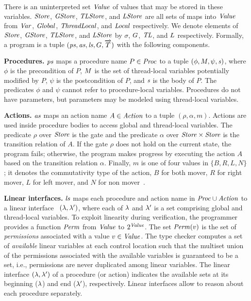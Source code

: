There is an uninterpreted set $\mathit{Value}$ of values that may be stored in these variables.
$\mathit{Store}$, $\mathit{GStore}$, $\mathit{TLStore}$, and $\mathit{LStore}$ are all sets of maps into $\mathit{Value}$
from $\mathit{Var}$, $\mathit{Global}$, $\mathit{ThreadLocal}$, and $\mathit{Local}$ respectively.
We denote elements of $\mathit{Store}$, $\mathit{GStore}$, $\mathit{TLStore}$, and $\mathit{LStore}$
by $\sigma$, $G$, $\mathit{TL}$, and $L$ respectively.
Formally, a \civl program is a tuple $(\mathit{ps}, \mathit{as}, \mathit{ls}, G, \overrightarrow{T})$ with the following components.

\noindent
{\bf Procedures.}
$\mathit{ps}$ maps a procedure name $P \in \mathit{Proc}$ to a tuple $(\phi, M, \psi, \mathit{s})$, 
where $\phi$ is the precondition of $P$, $M$ is the set of thread-local variables potentially modified by $P$, 
$\psi$ is the postcondition of $P$, and $\mathit{s}$ is the body of $P$.
The predicates $\phi$ and $\psi$ cannot refer to procedure-local variables.
Procedures do not have parameters, but parameters may be modeled using thread-local variables.

\noindent
{\bf Actions.}
$\mathit{as}$ maps an action name $A \in \mathit{Action}$ to a tuple $(\rho,\alpha,m)$.
Actions are used inside procedure bodies to access global and thread-local variables.
The predicate $\rho$ over $\mathit{Store}$ is the gate and the predicate $\alpha$ over $\mathit{Store} \times \mathit{Store}$ 
is the transition relation of $A$.
If the gate $\rho$ does not hold on the current state, the program fails;
otherwise, the program makes progress by executing the action $A$ based on the transition relation $\alpha$.
Finally, $m$ is one of four values in $\{B,R,L,N\}$;
it denotes the commutativity type of the action, $B$ for both mover, $R$ for right mover, $L$ for left mover, 
and $N$ for non mover~\cite{FlanaganFLQ08}. 

\noindent
{\bf Linear interfaces.}
$\mathit{ls}$ maps each procedure and action name in $\mathit{Proc} \cup \mathit{Action}$ to a linear interface~\cite{Wadler90lineartypes}
$(\lambda,\lambda')$, where each of $\lambda$ and $\lambda'$ is a set comprising global and thread-local variables.
To exploit linearity during verification, the programmer provides a function $\mathit{Perm}$ from $\mathit{Value}$ to $2^{\mathit{Value}}$.
The set $\mathit{Perm}(v)$ is the set of {\em permissions\/} associated with a value $v \in \mathit{Value}$.
The \civl type checker computes a set of {\em available\/} linear variables at each control location such that
the multiset union of the permissions associated with the available variables is guaranteed to be a set, i.e., 
permissions are never duplicated among linear variables.
The linear interface $(\lambda, \lambda')$ of a procedure (or action) indicates the available sets
at its beginning ($\lambda$) and end ($\lambda'$), respectively.
Linear interfaces allow \civl to reason about each procedure separately.

